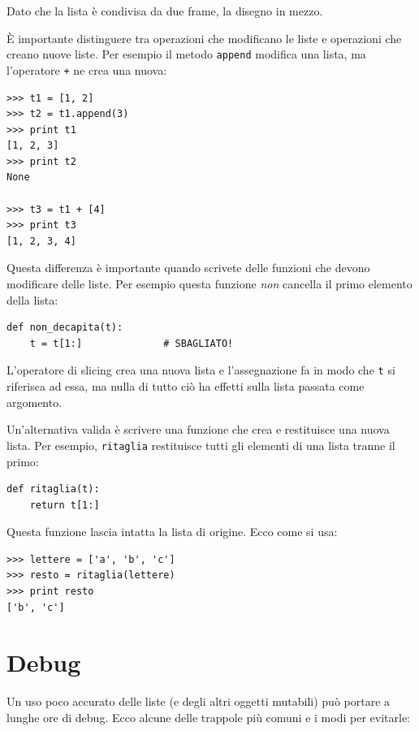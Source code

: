\documentclass[10pt]{book}
\begin{document}
Dato che la lista è condivisa da due frame, la disegno in mezzo.

È importante distinguere tra operazioni che modificano le liste e operazioni che creano nuove liste. Per esempio il metodo {\tt append} modifica una lista, ma l'operatore {\tt +} ne crea una nuova:

\begin{verbatim}
>>> t1 = [1, 2]
>>> t2 = t1.append(3)
>>> print t1
[1, 2, 3]
>>> print t2
None

>>> t3 = t1 + [4]
>>> print t3
[1, 2, 3, 4]
\end{verbatim}

Questa differenza è importante quando scrivete delle funzioni che devono modificare delle liste. Per esempio questa funzione
{\em non} cancella il primo elemento della lista:

\begin{verbatim}
def non_decapita(t):
    t = t[1:]              # SBAGLIATO!
\end{verbatim}

L'operatore di slicing crea una nuova lista e l'assegnazione fa in modo che {\tt t} si riferisca ad essa, ma nulla di tutto ciò ha effetti sulla lista passata come argomento.

Un'alternativa valida è scrivere una funzione che crea e restituisce una nuova lista. Per esempio, {\tt ritaglia} restituisce tutti gli elementi di una lista tranne il primo:

\begin{verbatim}
def ritaglia(t):
    return t[1:]
\end{verbatim}
%
Questa funzione lascia intatta la lista di origine. Ecco come si usa:

\begin{verbatim}
>>> lettere = ['a', 'b', 'c']
>>> resto = ritaglia(lettere)
>>> print resto
['b', 'c']
\end{verbatim}



\section{Debug}

Un uso poco accurato delle liste (e degli altri oggetti mutabili) può portare a lunghe ore di debug. Ecco alcune delle trappole più comuni e i modi per evitarle:
\end{document}
